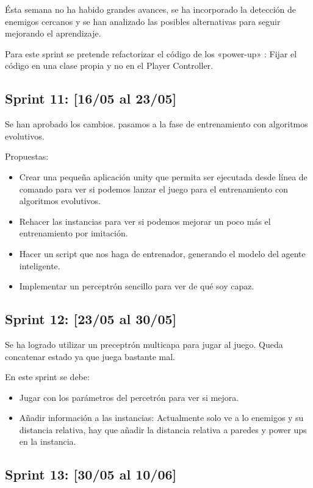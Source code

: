Ésta semana no ha habido grandes avances, se ha incorporado la detección de enemigos cercanos y se han analizado las posibles alternativas para seguir mejorando el aprendizaje.

Para este sprint se pretende refactorizar el código de los «power-up» : Fijar el código en una clase propia y no en el Player Controller.


\subsection{Sprint 11: [16/05 al 23/05]}

Se han aprobado los cambios. pasamos a la fase de entrenamiento con algoritmos evolutivos.

Propuestas:
\begin{itemize}
    \item Crear una pequeña aplicación unity que permita ser ejecutada desde línea de comando para ver si podemos lanzar el juego para el entrenamiento con algoritmos evolutivos.
    \item Rehacer las instancias para ver si podemos mejorar un poco más el entrenamiento por imitación.
    \item Hacer un script que nos haga de entrenador, generando el modelo del agente inteligente.
    \item Implementar un perceptrón sencillo para ver de qué soy capaz.
\end{itemize} 

\subsection{Sprint 12: [23/05 al 30/05]}

Se ha logrado utilizar un preceptrón multicapa para jugar al juego. Queda concatenar estado ya que juega bastante mal.

En este sprint se debe:
\begin{itemize}
    \item Jugar con los parámetros del percetrón para ver si mejora.
    \item Añadir información a las instancias: Actualmente solo ve a lo enemigos y su distancia relativa, hay que añadir la distancia relativa a paredes y power ups en la instancia. 
\end{itemize}



\subsection{Sprint 13: [30/05 al 10/06]}

